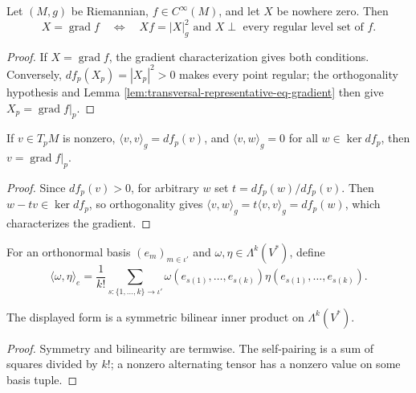 \begin{proposition}\label{prop:gradient-characterization}
\leanok
{}
Let $(M,g)$ be Riemannian, $f\in C^\infty(M)$, and let $X$ be nowhere zero.
Then
\[
X=\operatorname{grad}f\quad\Longleftrightarrow\quad Xf=|X|_g^2\text{ and }X\perp\text{ every regular level set of }f.
\]
\end{proposition}

\begin{proof}
\leanok
\sketch If $X=\operatorname{grad}f$, the gradient characterization gives both conditions. Conversely, $df_p(X_p)=|X_p|^2>0$ makes every point regular; the orthogonality hypothesis and Lemma \ref{lem:transversal-representative-eq-gradient} then give $X_p=\operatorname{grad}f|_p$.
\end{proof}

\begin{lemma}
\label{lem:transversal-representative-eq-gradient}
\leanok
{}
If $v\in T_pM$ is nonzero, $\langle v,v\rangle_g=df_p(v)$, and $\langle v,w\rangle_g=0$ for all $w\in\ker df_p$, then $v=\operatorname{grad}f|_p$.
\end{lemma}

\begin{proof}
\leanok
\sketch Since $df_p(v)>0$, for arbitrary $w$ set $t=df_p(w)/df_p(v)$. Then $w-tv\in\ker df_p$, so orthogonality gives $\langle v,w\rangle_g=t\langle v,v\rangle_g=df_p(w)$, which characterizes the gradient.
\end{proof}

\begin{definition}
\label{def:inner-k-covectors}
\leanok
For an orthonormal basis $(e_m)_{m\in\iota'}$ and $\omega,\eta\in\Lambda^k(V^*)$, define
\[
\langle\omega,\eta\rangle_e=\frac1{k!}\sum_{s:\{1,\ldots,k\}\to\iota'}\omega(e_{s(1)},\ldots,e_{s(k)})\eta(e_{s(1)},\ldots,e_{s(k)}).
\]
\end{definition}

\begin{lemma}
\label{lem:inner-k-covectors-posdef}
\leanok
{}
The displayed form is a symmetric bilinear inner product on $\Lambda^k(V^*)$.
\end{lemma}
\begin{proof}
\leanok
\sketch Symmetry and bilinearity are termwise. The self-pairing is a sum of squares divided by $k!$; a nonzero alternating tensor has a nonzero value on some basis tuple.
\end{proof}

